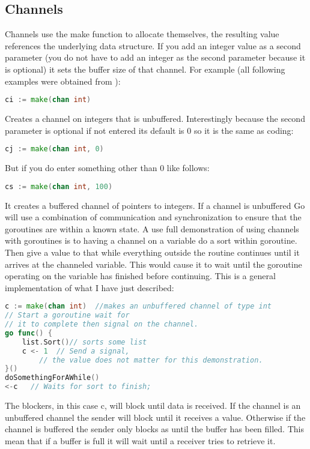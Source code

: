 \subsection{Channels}
Channels use the make function to allocate themselves, the resulting value references the underlying data structure. If you add an integer value as a second parameter (you do not have to add an integer as the second parameter because it is optional) it sets the buffer size of that channel. For example (all following examples were obtained from \cite{website:go-lang-documentation}): 
\begin{lstlisting}[language=Go]
ci := make(chan int)
\end{lstlisting}
Creates a channel on integers that is unbuffered. Interestingly because the second parameter is optional if not entered its default is 0 so it is the same as coding:
\begin{lstlisting}[language=Go]
cj := make(chan int, 0)
\end{lstlisting}
But if you do enter something other than 0 like follows:
\begin{lstlisting}[language=Go]
cs := make(chan int, 100) 
\end{lstlisting}
It creates a buffered channel of pointers to integers. 
If a channel is unbuffered Go will use a combination of communication and synchronization to ensure that the goroutines are within a known state.  A use full demonstration of using channels with goroutines is to having a channel on a variable do a sort within goroutine. Then give a value to that while everything outside the routine continues until it arrives at the channeled variable. This would cause it to wait until the goroutine operating on the variable has finished before continuing.  This is a general implementation of what I have just described:
\begin{lstlisting}[language=Go]
c := make(chan int)  //makes an unbuffered channel of type int
// Start a goroutine wait for
// it to complete then signal on the channel.
go func() {
    list.Sort()// sorts some list 
    c <- 1  // Send a signal, 
	    // the value does not matter for this demonstration.
}()
doSomethingForAWhile()
<-c   // Waits for sort to finish; 
\end{lstlisting}
The blockers, in this case c, will block until data is received. If the channel is an unbuffered channel the sender will block until it receives a value. Otherwise if the channel is buffered the sender only blocks as until the buffer has been filled. This mean that if a buffer is full it will wait until a receiver tries to retrieve it. 
